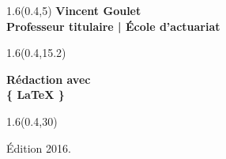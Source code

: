 \begingroup

\textblockorigin{0mm}{0mm}
\begin{frame}[plain]
  \begin{textblock*}{1.6\TPHorizModule}(0.4\TPHorizModule,5\TPVertModule)
    \titles\bfseries
    \fontsize{10}{11}\selectfont
    Vincent Goulet \\
    \mdseries
    \fontsize{9}{11}\selectfont
    Professeur titulaire | École d'actuariat
  \end{textblock*}

  \begin{textblock*}{1.6\TPHorizModule}(0.4\TPHorizModule,15.2\TPVertModule)
    \raggedright%
    \titles\bfseries
    \fontsize{20}{20}\selectfont
    Rédaction avec \\
    \rmfamily\mdseries
    \fontsize{22.5}{22.5}\selectfont
    \fontsize{40}{40}\selectfont%
    \{%
    \fontsize{35}{35}\selectfont%
    \LaTeX
    \fontsize{40}{40}\selectfont%
    \}
  \end{textblock*}

  \begin{textblock*}{1.6\TPHorizModule}(0.4\TPHorizModule,30\TPVertModule)
    \begin{minipage}{\textwidth}
      \titles\mdseries
      \fontsize{9}{11}\selectfont
      Édition 2016.{}
    \end{minipage}
  \end{textblock*}
\end{frame}
\endgroup

